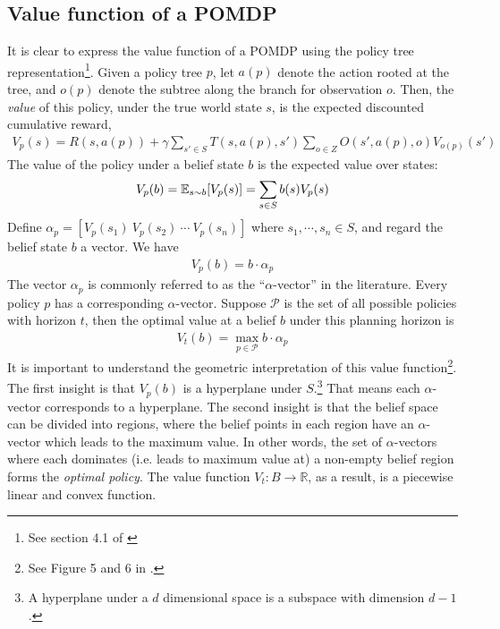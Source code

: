 \documentclass{article}
\begin{document}
\subsection{Value function of a POMDP}
It is clear to express the value function of a POMDP using the
policy tree representation\footnote{See section 4.1 of \citet{kaelbling1998planning}}.
Given a policy tree $p$, let $a(p)$ denote the action rooted at the tree, and
$o(p)$ denote the subtree along the branch for observation $o$. Then, the \emph{value}
of this policy, under the true world state $s$, is the expected discounted cumulative reward,
\begin{align}
\label{eq:val_func_p}V_p(s) = R(s,a(p)) + \gamma \sum_{s'\in S}T(s,a(p),s')\sum_{o\in Z}O(s',a(p),o) V_{o(p)}(s')
\end{align}
The value of the policy under a belief state $b$ is the expected value over states:
\begin{align}
V_p(b) = \mathbb{E}_{s\sim b} [V_p(s)] = \sum_{s\in S}b(s)V_p(s)
\end{align}
Define $\alpha_p=[ V_p(s_1)\ V_p(s_2)\ \cdots\ V_p(s_n)]$ where $s_1,\cdots,s_n\in S$, and regard the belief state $b$ a vector. We have
\begin{align}
V_p(b) = b\cdot \alpha_p
\end{align}
The vector $\alpha_p$ is commonly referred to as the ``$\alpha$-vector'' in the literature. Every policy $p$ has a corresponding $\alpha$-vector. Suppose $\mathcal{P}$ is the set of all possible policies with horizon $t$, then the optimal value at a belief $b$ under this planning horizon is
\begin{align}
V_t(b) = \max_{p\in\mathcal{P}} b\cdot \alpha_p
\end{align}
It is important to understand the geometric interpretation of this value function\footnote{See Figure 5 and 6 in \citet{kaelbling1998planning}.}. The first insight is that $V_p(b)$ is a hyperplane under $S$.\footnote{A hyperplane under a $d$ dimensional space is a subspace with dimension $d-1$.} That means each $\alpha$-vector corresponds to a hyperplane. The second insight is that the belief space can be divided into regions, where the belief points in each region have an $\alpha$-vector which leads to the maximum value. In other words, the set of $\alpha$-vectors where each dominates (i.e. leads to maximum value at) a non-empty belief region forms the \emph{optimal policy}. The value function $V_t:B\rightarrow \mathbb{R}$, as a result, is a piecewise linear and convex function.
\end{document}
